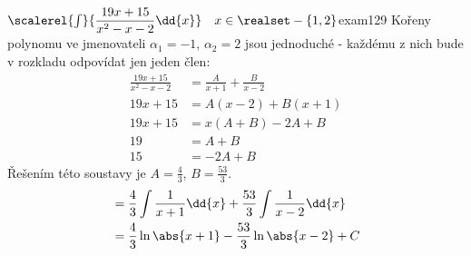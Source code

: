 \begin{mathexam}{\(\protect\scalerel{\int}{\dfrac{19x+15}{x^2-x-2}\dd{x}} \quad x\in
  \realset-\{1,2\}\)}{exam129} 
  Kořeny polynomu ve jmenovateli $\alpha_1 = -1$, $\alpha_2 = 2$ jsou jednoduché - každému z nich
  bude v rozkladu odpovídat jen jeden člen: 
    \begin{align*}
      \frac{19x+15}{x^2-x-2}      &= \frac{A}{x+1} + \frac{B}{x-2} \\
                        19x +15   &= A(x-2) + B(x+1)               \\
                        19x +15   &= x(A+B) - 2A + B               \\
                        19        &= A + B                         \\
                             15   &=        - 2A + B
    \end{align*}              
    Řešením této soustavy je \(A = \frac{4}{3}\), \(B = \frac{53}{3}\).
    \begin{align*}
      &= \frac{4}{3}\int{\frac{1}{x+1}}\dd{x} + \frac{53}{3}\int{\frac{1}{x-2}}\dd{x}  \\
      &= \frac{4}{3}\ln\abs{x+1} - \frac{53}{3}\ln\abs{x-2} +  C
    \end{align*}   
\end{mathexam}